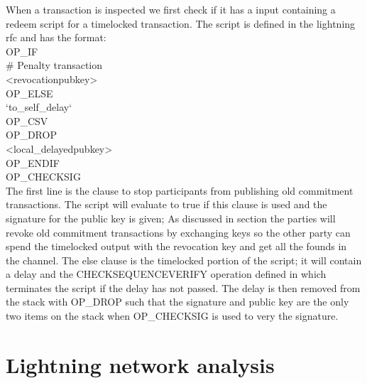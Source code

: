 When a transaction is inspected we first check if it has a input containing a redeem script for a timelocked transaction.
The script is defined in the lightning rfc  and has the format:
\\

\noindent OP\_IF \\
    # Penalty transaction \\
    <revocationpubkey> \\
OP\_ELSE\\
    `to\_self\_delay`\\
    OP\_CSV\\
    OP\_DROP\\
    <local\_delayedpubkey>\\
OP\_ENDIF\\
OP\_CHECKSIG\\

The first line is the clause to stop participants from publishing old commitment transactions. The script will evaluate to true if this clause is used and the signature for the public key is given; As discussed in section  the parties will revoke old commitment transactions by exchanging keys so the other party can spend the timelocked output with the revocation key and get all the founds in the channel. The else clause is the timelocked portion of the script; it will contain a delay and the CHECKSEQUENCEVERIFY operation defined in  which terminates the script if the delay has not passed. The delay is then removed from the stack with OP\_DROP such that the signature and public key are the only two items on the stack when OP\_CHECKSIG is used to very the signature.




\section{Lightning network analysis}




